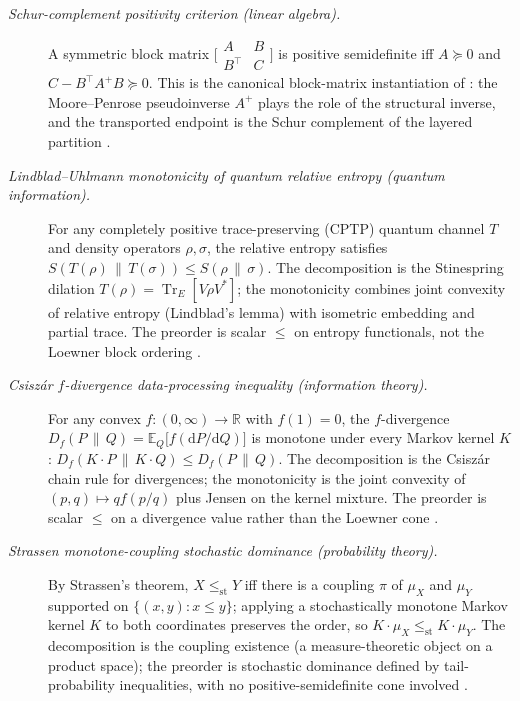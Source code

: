 \documentclass[11pt]{article}
\theoremstyle{definition}
\begin{document}
\begin{description}
\item[\emph{Schur-complement positivity criterion (linear algebra).}]
A symmetric block matrix
\(\bigl[\begin{smallmatrix}A&B\\B^{\!\top}&C\end{smallmatrix}\bigr]\)
is positive semidefinite iff \(A\succeq0\) and
\(C-B^{\!\top}A^{+}B\succeq0\).  This is the canonical block-matrix
instantiation of : the Moore--Penrose pseudoinverse
\(A^{+}\) plays the role of the structural inverse, and the
transported endpoint is the Schur complement of the layered
partition \citep{Zhang2005SchurApplications}.

\item[\emph{Lindblad--Uhlmann monotonicity of quantum relative entropy
(quantum information).}]
For any completely positive trace-preserving (CPTP) quantum channel
\(T\) and density operators \(\rho,\sigma\), the relative entropy
satisfies \(S(T(\rho)\,\|\,T(\sigma))\le S(\rho\,\|\,\sigma)\).  The
decomposition is the Stinespring dilation
\(T(\rho)=\operatorname{Tr}_E[V\rho V^{*}]\); the monotonicity
combines joint convexity of relative entropy (Lindblad's lemma) with
isometric embedding and partial trace.  The preorder is scalar
\(\le\) on entropy functionals, not the Loewner block ordering
\citep{Lindblad1975CompletelyPositiveMaps}.

\item[\emph{Csiszár \(f\)-divergence data-processing inequality
(information theory).}]
For any convex \(f:(0,\infty)\to\mathbb R\) with \(f(1)=0\), the
\(f\)-divergence
\(D_f(P\,\|\,Q)=\mathbb E_Q\!\bigl[f(\mathrm dP/\mathrm dQ)\bigr]\) is
monotone under every Markov kernel \(K\):
\(D_f(K\!\cdot\!P\,\|\,K\!\cdot\!Q)\le D_f(P\,\|\,Q)\).  The
decomposition is the Csiszár chain rule for divergences; the
monotonicity is the joint convexity of \((p,q)\mapsto qf(p/q)\) plus
Jensen on the kernel mixture.  The preorder is scalar \(\le\) on a
divergence value rather than the Loewner cone
\citep{LieseVajda2006Divergences}.

\item[\emph{Strassen monotone-coupling stochastic dominance
(probability theory).}]
By Strassen's theorem, \(X\le_{\mathrm{st}}Y\) iff there is a
coupling \(\pi\) of \(\mu_X\) and \(\mu_Y\) supported on
\(\{(x,y):x\le y\}\); applying a stochastically monotone Markov
kernel \(K\) to both coordinates preserves the order, so
\(K\!\cdot\!\mu_X\le_{\mathrm{st}}K\!\cdot\!\mu_Y\).  The
decomposition is the coupling existence (a measure-theoretic object
on a product space); the preorder is stochastic dominance defined by
tail-probability inequalities, with no positive-semidefinite cone
involved \citep{Strassen1965ExistenceProbabilityMeasures}.


\end{description}
\end{document}
